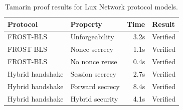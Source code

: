 \begin{table}[H]
\centering
\small
\begin{tabular}{@{}llrl@{}}
\toprule
\textbf{Protocol} & \textbf{Property} & \textbf{Time} & \textbf{Result} \\
\midrule
FROST-BLS & Unforgeability & 3.2s & Verified \\
FROST-BLS & Nonce secrecy & 1.1s & Verified \\
FROST-BLS & No nonce reuse & 0.4s & Verified \\
Hybrid handshake & Session secrecy & 2.7s & Verified \\
Hybrid handshake & Forward secrecy & 8.4s & Verified \\
Hybrid handshake & Hybrid security & 4.1s & Verified \\
\bottomrule
\end{tabular}
\caption{Tamarin proof results for Lux Network protocol models.}
\end{table}

